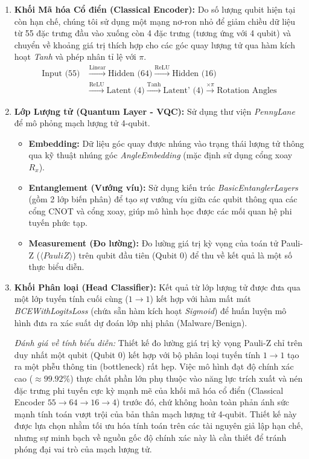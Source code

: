 \begin{enumerate}
    \item \textbf{Khối Mã hóa Cổ điển (Classical Encoder):}
    Do số lượng qubit hiện tại còn hạn chế, chúng tôi sử dụng một mạng nơ-ron nhỏ để giảm chiều dữ liệu từ 55 đặc trưng đầu vào xuống còn 4 đặc trưng (tương ứng với 4 qubit) và chuyển về khoảng giá trị thích hợp cho các góc quay lượng tử qua hàm kích hoạt \textit{Tanh} và phép nhân tỉ lệ với $\pi$.
    \begin{align*}
    \text{Input (55)} &\xrightarrow{\text{Linear}} \text{Hidden (64)} \xrightarrow{\text{ReLU}} \text{Hidden (16)} \\
    &\xrightarrow{\text{ReLU}} \text{Latent (4)} \xrightarrow{\text{Tanh}} \text{Latent' (4)} \xrightarrow{\times \pi} \text{Rotation Angles}
    \end{align*}
    
    \item \textbf{Lớp Lượng tử (Quantum Layer - VQC):}
    Sử dụng thư viện \textit{PennyLane} để mô phỏng mạch lượng tử 4-qubit.
    \begin{itemize}
        \item \textbf{Embedding:} Dữ liệu góc quay được nhúng vào trạng thái lượng tử thông qua kỹ thuật nhúng góc \textit{AngleEmbedding} (mặc định sử dụng cổng xoay $R_x$).
        \item \textbf{Entanglement (Vướng víu):} Sử dụng kiến trúc \textit{BasicEntanglerLayers} (gồm 2 lớp biến phân) để tạo sự vướng víu giữa các qubit thông qua các cổng CNOT và cổng xoay, giúp mô hình học được các mối quan hệ phi tuyến phức tạp.
        \item \textbf{Measurement (Đo lường):} Đo lường giá trị kỳ vọng của toán tử Pauli-Z ($\langle PauliZ \rangle$) trên qubit đầu tiên (Qubit 0) để thu về kết quả là một số thực biểu diễn.
    \end{itemize}
    
    \item \textbf{Khối Phân loại (Head Classifier):}
    Kết quả từ lớp lượng tử được đưa qua một lớp tuyến tính cuối cùng ($1 \rightarrow 1$) kết hợp với hàm mất mát \textit{BCEWithLogitsLoss} (chứa sẵn hàm kích hoạt \textit{Sigmoid}) để huấn luyện mô hình đưa ra xác suất dự đoán lớp nhị phân (Malware/Benign).
    
    \textit{Đánh giá về tính biểu diễn:} Thiết kế đo lường giá trị kỳ vọng Pauli-Z chỉ trên duy nhất một qubit (Qubit 0) kết hợp với bộ phân loại tuyến tính $1 \rightarrow 1$ tạo ra một phễu thông tin (bottleneck) rất hẹp. Việc mô hình đạt độ chính xác cao ($\approx 99.92\%$) thực chất phần lớn phụ thuộc vào năng lực trích xuất và nén đặc trưng phi tuyến cực kỳ mạnh mẽ của khối mã hóa cổ điển (Classical Encoder $55 \rightarrow 64 \rightarrow 16 \rightarrow 4$) trước đó, chứ không hoàn toàn phản ánh sức mạnh tính toán vượt trội của bản thân mạch lượng tử 4-qubit. Thiết kế này được lựa chọn nhằm tối ưu hóa tính toán trên các tài nguyên giả lập hạn chế, nhưng sự minh bạch về nguồn gốc độ chính xác này là cần thiết để tránh phóng đại vai trò của mạch lượng tử.
\end{enumerate}




